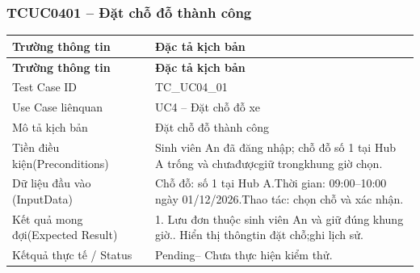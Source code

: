 \subsubsection{TCUC0401 – Đặt chỗ đỗ thành công}
\begin{longtable}{|L{0.24\textwidth}|L{0.70\textwidth}|}
\hline
\textbf{Trường thông tin} & \textbf{Đặc tả kịch bản} \\
\hline
\endfirsthead
\hline
\textbf{Trường thông tin} & \textbf{Đặc tả kịch bản} \\
\hline
\endhead
Test Case ID & TC\_UC04\_01 \\
\hline
Use Case liênquan & UC4 – Đặt chỗ đỗ xe \\
\hline
Mô tả kịch bản & Đặt chỗ đỗ thành công \\
\hline
Tiền điều kiện\newline (Preconditions) & Sinh viên An đã đăng nhập; chỗ đỗ số 1 tại Hub A trống và chưa\newline đượcgiữ trongkhung giờ chọn. \\
\hline
Dữ liệu đầu vào (Input\newline Data) & Chỗ đỗ: số 1 tại Hub A.\newline Thời gian: 09:00–10:00 ngày 01/12/2026.\newline Thao tác: chọn chỗ và xác nhận. \\
\hline
Kết quả mong đợi\newline (Expected Result) & 1. Lưu đơn thuộc sinh viên An và giữ đúng khung giờ.. Hiển thị thôngtin đặt chỗ;ghi lịch sử. \\
\hline
Kếtquả thực tế / Status & Pending– Chưa thực hiện kiểm thử. \\
\hline
\end{longtable}
\vspace{-0.5\baselineskip}
